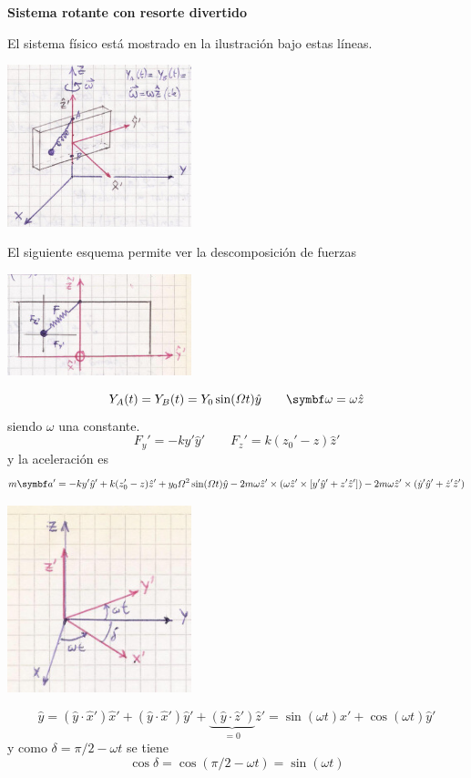 \documentclass[10pt,oneside]{CBFT_book}
\begin{document}
\begin{ejemplo}{\bf Sistema rotante con resorte divertido}

El sistema físico está mostrado en la ilustración bajo estas líneas.

\includegraphics[width=0.4\textwidth]{images/fig_mc_rotantes_ejemplo_bloque1.jpg}

El siguiente esquema permite ver la descomposición de fuerzas

\includegraphics[width=0.4\textwidth]{images/fig_mc_rotantes_ejemplo_bloque2.jpg}

\[
	Y_A(t) = Y_B(t) = Y_0 \sin (\Omega t) \hat{y} \qquad \vb{\omega} = \omega \hat{z}
\]
siendo $\omega$ una constante.
\[
	F_y' = - k y' \hat{y}' \qquad F_z' = k(z_0' - z) \hat{z}'
\]
y la aceleración es 
\[
	m \vb{a}' = - ky' \hat{y}' + k (z_0' - z) \hat{z}' + y_0 \Omega^2 \sin (\Omega t) \hat{y}
	- 2 m \omega \hat{z}' \times ( \omega \hat{z}' \times [ y' \hat{y}' + z' \hat{z}' ] ) 
	- 2 m \omega \hat{z}' \times ( \dot{y}' \hat{y}' + \dot{z}' \hat{z}' )
\]
 
\includegraphics[width=0.4\textwidth]{images/fig_mc_rotantes_ejemplo_bloque3.jpg}

\[
	\hat{y} = (\hat{y}\cdot\hat{x}')\hat{x}' +  (\hat{y}\cdot\hat{x}')\hat{y}' + 
	\underbrace{(\hat{y}\cdot\hat{z}') }_{=0}\hat{z}'
	= \sin(\omega t) \hat{x}' + \cos(\omega t) \hat{y}'
\]
y como $\delta = \pi/2 - \omega t$ se tiene 
\[
	\cos \delta = \cos ( \pi/2 - \omega t ) = \sin ( \omega t )
\]


\end{ejemplo}
\end{document}
